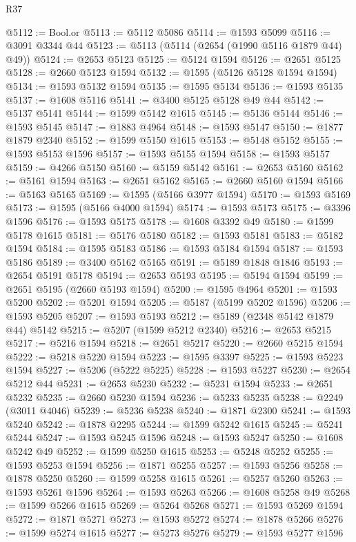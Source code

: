 \begin{lexlean}{R37}
\begin{coremodule}
@5112 := Bool.or
@5113 := @5112 @5086
@5114 := @1593 @5099
@5116 := @3091 @3344 @44
@5123 := @5113 (@5114 (@2654 (@1990 @5116 @1879 @44) @49))
@5124 := @2653 @5123
@5125 := @5124 @1594
@5126 := @2651 @5125
@5128 := @2660 @5123 @1594
@5132 := @1595 (@5126 @5128 @1594 @1594)
@5134 := @1593 @5132 @1594
@5135 := @1595 @5134
@5136 := @1593 @5135
@5137 := @1608 @5116
@5141 := @3400 @5125 @5128 @49 @44
@5142 := @5137 @5141
@5144 := @1599 @5142 @1615
@5145 := @5136 @5144
@5146 := @1593 @5145
@5147 := @1883 @4964
@5148 := @1593 @5147
@5150 := @1877 @1879 @2340
@5152 := @1599 @5150 @1615
@5153 := @5148 @5152
@5155 := @1593 @5153 @1596
@5157 := @1593 @5155 @1594
@5158 := @1593 @5157
@5159 := @4266 @5150
@5160 := @5159 @5142
@5161 := @2653 @5160
@5162 := @5161 @1594
@5163 := @2651 @5162
@5165 := @2660 @5160 @1594
@5166 := @5163 @5165
@5169 := @1595 (@5166 @3977 @1594)
@5170 := @1593 @5169
@5173 := @1595 (@5166 @4000 @1594)
@5174 := @1593 @5173
@5175 := @3396 @1596
@5176 := @1593 @5175
@5178 := @1608 @3392 @49
@5180 := @1599 @5178 @1615
@5181 := @5176 @5180
@5182 := @1593 @5181
@5183 := @5182 @1594
@5184 := @1595 @5183
@5186 := @1593 @5184 @1594
@5187 := @1593 @5186
@5189 := @3400 @5162 @5165
@5191 := @5189 @1848 @1846
@5193 := @2654 @5191 @5178
@5194 := @2653 @5193
@5195 := @5194 @1594
@5199 := @2651 @5195 (@2660 @5193 @1594)
@5200 := @1595 @4964
@5201 := @1593 @5200
@5202 := @5201 @1594
@5205 := @5187 (@5199 @5202 @1596)
@5206 := @1593 @5205
@5207 := @1593 @5193
@5212 := @5189 (@2348 @5142 @1879 @44) @5142
@5215 := @5207 (@1599 @5212 @2340)
@5216 := @2653 @5215
@5217 := @5216 @1594
@5218 := @2651 @5217
@5220 := @2660 @5215 @1594
@5222 := @5218 @5220 @1594
@5223 := @1595 @3397
@5225 := @1593 @5223 @1594
@5227 := @5206 (@5222 @5225)
@5228 := @1593 @5227
@5230 := @2654 @5212 @44
@5231 := @2653 @5230
@5232 := @5231 @1594
@5233 := @2651 @5232
@5235 := @2660 @5230 @1594
@5236 := @5233 @5235
@5238 := @2249 (@3011 @4046)
@5239 := @5236 @5238
@5240 := @1871 @2300
@5241 := @1593 @5240
@5242 := @1878 @2295
@5244 := @1599 @5242 @1615
@5245 := @5241 @5244
@5247 := @1593 @5245 @1596
@5248 := @1593 @5247
@5250 := @1608 @5242 @49
@5252 := @1599 @5250 @1615
@5253 := @5248 @5252
@5255 := @1593 @5253 @1594
@5256 := @1871 @5255
@5257 := @1593 @5256
@5258 := @1878 @5250
@5260 := @1599 @5258 @1615
@5261 := @5257 @5260
@5263 := @1593 @5261 @1596
@5264 := @1593 @5263
@5266 := @1608 @5258 @49
@5268 := @1599 @5266 @1615
@5269 := @5264 @5268
@5271 := @1593 @5269 @1594
@5272 := @1871 @5271
@5273 := @1593 @5272
@5274 := @1878 @5266
@5276 := @1599 @5274 @1615
@5277 := @5273 @5276
@5279 := @1593 @5277 @1596

\end{coremodule}
\end{lexlean}
